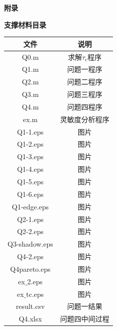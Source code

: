 \documentclass[a4paper,12pt]{ctexart} %
\begin{document}
	\newpage
	\begin{center}
		\large\textbf{附录}\\\par
	\end{center}
	\centering\noindent\normalsize\textbf{支撑材料目录}
	\begin{table}[h]
	\centering
	\begin{tabular}{cc}
		\toprule
		文件 & 说明\\  \midrule

Q0.m & 求解$\tau_c$程序\\
Q1.m & 问题一程序\\
Q2.m & 问题二程序\\
Q3.m & 问题三程序\\
Q4.m & 问题四程序\\
ex.m & 灵敏度分析程序\\
Q1-1.eps & 图片\\
Q1-2.eps& 图片\\
Q1-3.eps& 图片\\
Q1-4.eps& 图片\\
Q1-5.eps& 图片\\
Q1-6.eps& 图片\\
Q1-edge.eps& 图片\\
Q2-1.eps& 图片\\
Q2-2.eps& 图片\\
Q3-shadow.eps& 图片\\
Q4-2.eps& 图片\\
Q4pareto.eps& 图片\\
ex$\_$2.eps& 图片\\
ex$\_$tc.eps& 图片\\
result.csv&问题一结果\\
Q4.xlsx&问题四中间过程\\
		\bottomrule 
	\end{tabular}
\end{table}\par
\end{document}
